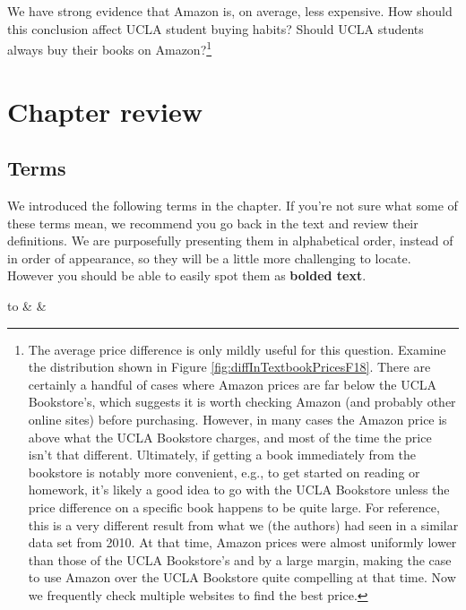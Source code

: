 \documentclass[
  10pt,
  openany]{book}
\theoremstyle{definition}
\theoremstyle{definition}
\theoremstyle{definition}
\theoremstyle{definition}
\theoremstyle{remark}
\begin{document}
We have strong evidence that Amazon is,
on average, less expensive.
How should this conclusion affect UCLA student
buying habits?
Should UCLA students always buy their books
on Amazon?\footnote{The average price difference
  is only mildly useful for this question.
  Examine the distribution shown in
  Figure \ref{fig:diffInTextbookPricesF18}.
  There are certainly a handful of cases where
  Amazon prices are far below the UCLA Bookstore's,
  which suggests it is worth checking Amazon
  (and probably other online sites) before purchasing.
  However, in many cases the Amazon price is
  above what the UCLA Bookstore charges,
  and most of the time the price isn't that different.
  Ultimately, if getting a book immediately from
  the bookstore is notably more convenient,
  e.g., to get started on reading or homework,
  it's likely a good idea to go with the UCLA
  Bookstore unless the price difference on a
  specific book happens to be quite large.
  For reference, this is a very different result
  from what we (the authors) had seen in a similar
  data set from 2010.
  At that time, Amazon prices were almost uniformly
  lower than those of the UCLA Bookstore's and by
  a large margin, making the case to use Amazon over
  the UCLA Bookstore quite compelling at that time.
  Now we frequently check multiple websites
  to find the best price.}


\section{Chapter review}\label{chp18-review}

\subsection*{Terms}\label{terms-14}

We introduced the following terms in the chapter. If you're not sure what some of these terms mean, we recommend you go back in the text and review their definitions. We are purposefully presenting them in alphabetical order, instead of in order of appearance, so they will be a little more challenging to locate. However you should be able to easily spot them as \textbf{bolded text}.

\begin{tabu} to 
\toprule
{} &  & \\
\bottomrule
\end{tabu}
\end{document}
